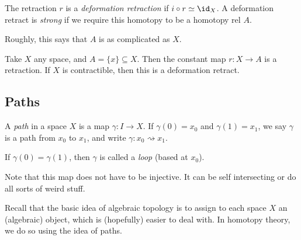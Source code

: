\documentclass[a4paper]{article}
\begin{document}
\begin{defi}
  The retraction $r$ is a \emph{deformation retraction} if $i\circ r \simeq \id_X$. A deformation retract is \emph{strong} if we require this homotopy to be a homotopy rel $A$.
\end{defi}
Roughly, this says that $A$ is as complicated as $X$.

\begin{eg}
Take $X$ any space, and $A = \{x\}\subseteq X$. Then the constant map $r: X\to A$ is a retraction. If $X$ is contractible, then this is a deformation retract.
\end{eg}

\subsection{Paths}
\begin{defi}[Path]
  A \emph{path} in a space $X$ is a map $\gamma: I\to X$. If $\gamma(0) = x_0$ and $\gamma(1) = x_1$, we say $\gamma$ is a path from $x_0$ to $x_1$, and write $\gamma: x_0 \rightsquigarrow x_1$.

  If $\gamma(0) = \gamma(1)$, then $\gamma$ is called a \emph{loop} (based at $x_0$).
  \begin{center}
  \end{center}
\end{defi}
Note that this map does not have to be injective. It can be self intersecting or do all sorts of weird stuff.

Recall that the basic idea of algebraic topology is to assign to each space $X$ an (algebraic) object, which is (hopefully) easier to deal with. In homotopy theory, we do so using the idea of paths.
\end{document}
